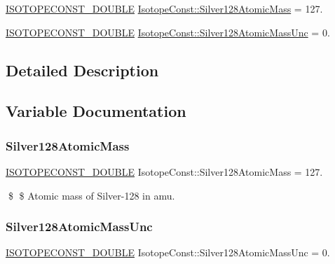 \begin{DoxyCompactItemize}
\item 
\mbox{\hyperlink{group___isotope_const-_macros_ga8f45a7272ce02c0b4c65c44636ed719a}{I\+S\+O\+T\+O\+P\+E\+C\+O\+N\+S\+T\+\_\+\+D\+O\+U\+B\+LE}} \mbox{\hyperlink{group___isotope_const-_silver-_ag128_ga5542f6fcd3439be3acbff210032509cd}{Isotope\+Const\+::\+Silver128\+Atomic\+Mass}} = 127.
\item 
\mbox{\hyperlink{group___isotope_const-_macros_ga8f45a7272ce02c0b4c65c44636ed719a}{I\+S\+O\+T\+O\+P\+E\+C\+O\+N\+S\+T\+\_\+\+D\+O\+U\+B\+LE}} \mbox{\hyperlink{group___isotope_const-_silver-_ag128_gadd3f43183ccb009c054b373de4594c66}{Isotope\+Const\+::\+Silver128\+Atomic\+Mass\+Unc}} = 0.
\end{DoxyCompactItemize}


\subsection{Detailed Description}


\subsection{Variable Documentation}
\mbox{\label{group___isotope_const-_silver-_ag128_ga5542f6fcd3439be3acbff210032509cd}} 
\subsubsection{\texorpdfstring{Silver128\+Atomic\+Mass}{Silver128AtomicMass}}
{\footnotesize\ttfamily \mbox{\hyperlink{group___isotope_const-_macros_ga8f45a7272ce02c0b4c65c44636ed719a}{I\+S\+O\+T\+O\+P\+E\+C\+O\+N\+S\+T\+\_\+\+D\+O\+U\+B\+LE}} Isotope\+Const\+::\+Silver128\+Atomic\+Mass = 127.}

\$ \$ Atomic mass of Silver-\/128 in amu. \mbox{\label{group___isotope_const-_silver-_ag128_gadd3f43183ccb009c054b373de4594c66}} 
\subsubsection{\texorpdfstring{Silver128\+Atomic\+Mass\+Unc}{Silver128AtomicMassUnc}}
{\footnotesize\ttfamily \mbox{\hyperlink{group___isotope_const-_macros_ga8f45a7272ce02c0b4c65c44636ed719a}{I\+S\+O\+T\+O\+P\+E\+C\+O\+N\+S\+T\+\_\+\+D\+O\+U\+B\+LE}} Isotope\+Const\+::\+Silver128\+Atomic\+Mass\+Unc = 0.}

